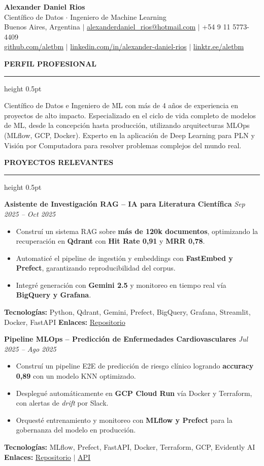 \documentclass[9pt]{extarticle}
\newcommand{\cvsection}[1]{%
  \vspace{6pt}%
  {\small\bfseries\uppercase{#1}}%
  \vspace{2pt}\hrule height 0.5pt\vspace{5pt}%
}
\newcommand{\project}[5]{%
  \textbf{#1} \hfill \textit{\small #2}\\[-14pt]
  \begin{itemize}[leftmargin=1.2em, itemsep=0pt, topsep=2pt, parsep=0pt]
    #3
  \end{itemize}
  \vspace{1pt}
  {\small\textbf{Tecnologías:} #4 \quad \textbf{Enlaces:} #5}
  \vspace{5pt}%
}
\begin{document}
\begin{center}
  {\LARGE\bfseries Alexander Daniel Rios}\\[4pt]
  {\small
    Científico de Datos \(\cdot\) Ingeniero de Machine Learning\\[3pt]
    Buenos Aires, Argentina
    \(\mid\) \href{mailto:alexanderdaniel_rios@hotmail.com}{alexanderdaniel\_rios@hotmail.com}
    \(\mid\) +54 9 11 5773-4409\\[2pt]
    \href{https://github.com/aletbm}{github.com/aletbm}
    \(\mid\) \href{https://www.linkedin.com/in/alexander-daniel-rios}{linkedin.com/in/alexander-daniel-rios}
    \(\mid\) \href{https://www.linktr.ee/aletbm}{linktr.ee/aletbm}
  }
\end{center}

\vspace{2pt}

\cvsection{Perfil Profesional}

Científico de Datos e Ingeniero de ML con más de 4 años de experiencia en proyectos de alto
impacto. Especializado en el ciclo de vida completo de modelos de ML, desde la concepción
hasta producción, utilizando arquitecturas MLOps (MLflow, GCP, Docker). Experto en la
aplicación de Deep Learning para PLN y Visión por Computadora para resolver problemas complejos
del mundo real.

\cvsection{Proyectos Relevantes}

\project
  {Asistente de Investigación RAG – IA para Literatura Científica}
  {Sep 2025 – Oct 2025}
  {
    \item Construí un sistema RAG sobre \textbf{más de 120k documentos}, optimizando la recuperación en \textbf{Qdrant} con \textbf{Hit Rate 0,91} y \textbf{MRR 0,78}.
    \item Automaticé el pipeline de ingestión y embeddings con \textbf{FastEmbed y Prefect}, garantizando reproducibilidad del corpus.
    \item Integré generación con \textbf{Gemini 2.5} y monitoreo en tiempo real vía \textbf{BigQuery y Grafana}.
  }
  {Python, Qdrant, Gemini, Prefect, BigQuery, Grafana, Streamlit, Docker, FastAPI}
  {\href{https://github.com/aletbm/RAG_Research_Assistant}{Repositorio}}

\project
  {Pipeline MLOps – Predicción de Enfermedades Cardiovasculares}
  {Jul 2025 – Ago 2025}
  {
    \item Construí un pipeline E2E de predicción de riesgo clínico logrando \textbf{accuracy 0,89} con un modelo KNN optimizado.
    \item Desplegué automáticamente en \textbf{GCP Cloud Run} vía Docker y Terraform, con alertas de \textit{drift} por Slack.
    \item Orquesté entrenamiento y monitoreo con \textbf{MLflow y Prefect} para la gobernanza del modelo en producción.
  }
  {MLflow, Prefect, FastAPI, Docker, Terraform, GCP, Evidently AI}
  {\href{https://github.com/aletbm/Cardiovascular-Diseases_E2E_MLPipeline}{Repositorio} \(\mid\) \href{https://cardiovascular-diseases-api-761922006747.us-east1.run.app}{API}}
\end{document}
